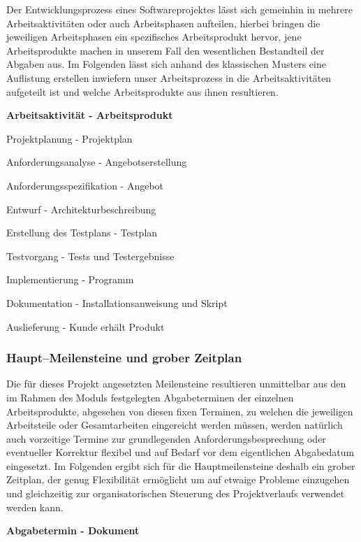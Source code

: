\documentclass[fontsize=12pt,paper=a4,twoside]{scrartcl}
\begin{document}
Der Entwicklungsprozess eines Softwareprojektes lässt sich gemeinhin in mehrere Arbeitsaktivitäten oder auch Arbeitsphasen aufteilen, hierbei bringen die jeweiligen Arbeitsphasen ein spezifisches Arbeitsprodukt hervor, jene Arbeitsprodukte machen in unserem Fall den wesentlichen Bestandteil der Abgaben aus.\newline
Im Folgenden lässt sich anhand des klassischen Musters eine Auflistung erstellen inwiefern unser Arbeitsprozess in die Arbeitsaktivitäten aufgeteilt ist und welche Arbeitsprodukte aus ihnen resultieren.\newline

\textbf{Arbeitsaktivität - Arbeitsprodukt}

Projektplanung - Projektplan

Anforderungsanalyse - Angebotserstellung

Anforderungsspezifikation - Angebot

Entwurf - Architekturbeschreibung

Erstellung des Testplans - Testplan

Testvorgang - Tests und Testergebnisse

Implementierung - Programm

Dokumentation - Installationsanweisung und Skript

Auslieferung - Kunde erhält Produkt

\subsubsection{Haupt--Meilensteine und grober Zeitplan}

Die für dieses Projekt angesetzten Meilensteine resultieren unmittelbar aus den im Rahmen des Moduls festgelegten Abgabeterminen der einzelnen Arbeitsprodukte, abgesehen von diesen fixen Terminen, zu welchen die jeweiligen Arbeitsteile oder Gesamtarbeiten eingereicht werden müssen, werden natürlich auch vorzeitige Termine zur grundlegenden Anforderungsbesprechung oder eventueller Korrektur flexibel und auf Bedarf vor dem eigentlichen Abgabedatum eingesetzt.\newline
Im Folgenden ergibt sich für die Hauptmeilensteine deshalb ein grober Zeitplan, der genug Flexibilität ermöglicht um auf etwaige Probleme einzugehen und gleichzeitig zur organisatorischen Steuerung des Projektverlaufs verwendet werden kann.\newline

\textbf{Abgabetermin - Dokument}
\end{document}

